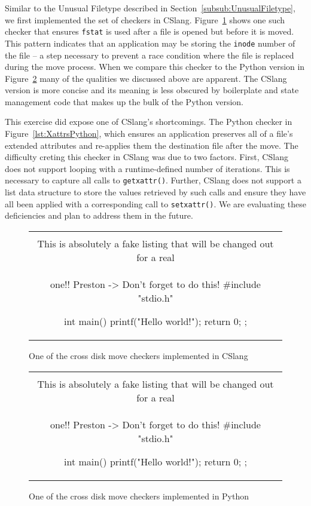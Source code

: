 Similar to the Unusual Filetype described in
Section~\ref{subsub:UnusualFiletype},
we first implemented the
set of checkers in CSlang.  Figure~\ref{lst:Cross-DiskMoveCSlang} shows one
such checker that ensures {\tt fstat} is used after a file is opened but
before it is moved.  This pattern indicates that an application may be
storing the {\tt inode} number of the file -- a step necessary to prevent a race
condition where the file is replaced during the move process.  When
we compare this checker to the Python version in
Figure~\ref{lst:Cross-DiskMovePython} many of the qualities we discussed
above are apparent.  The CSlang version is more concise and its meaning is
less obscured by boilerplate and state management code that makes up the
bulk of the Python version.

This exercise did expose one of CSlang's shortcomings.
The Python checker in Figure~\ref{lst:XattrsPython},
which ensures an application
preserves all of a file's extended attributes and re-applies them the
destination file after the move.
The difficulty creting this checker
in CSlang was due to two factors.
First, CSlang does not support looping with a
runtime-defined number of iterations.  This is necessary to capture all
calls to {\tt getxattr()}.
Further, CSlang does not support a list data structure to store the values
retrieved by such calls and ensure they have all been applied with a
corresponding call to {\tt setxattr()}.
We are evaluating these deficiencies and plan to address them in the
future.

\begin{figure}[H]
\centering
\begin{tabular}{c}
\begin{lstlisting}
\\ This is absolutely a fake listing that will be changed out for a real
\\ one!!  Preston -> Don't forget to do this!
#include "stdio.h"

int main() {
    printf("Hello world!\n");
    return 0;
};
\end{lstlisting}
\end{tabular}
\caption{One of the cross disk move checkers implemented in CSlang}
\label{lst:Cross-DiskMoveCSlang}
\end{figure}


\begin{figure}[H]
\centering
\begin{tabular}{c}
\begin{lstlisting}
\\ This is absolutely a fake listing that will be changed out for a real
\\ one!!  Preston -> Don't forget to do this!
#include "stdio.h"

int main() {
    printf("Hello world!\n");
    return 0;
};
\end{lstlisting}
\end{tabular}
\caption{One of the cross disk move checkers implemented in Python}
\label{lst:Cross-DiskMovePython}
\end{figure}

